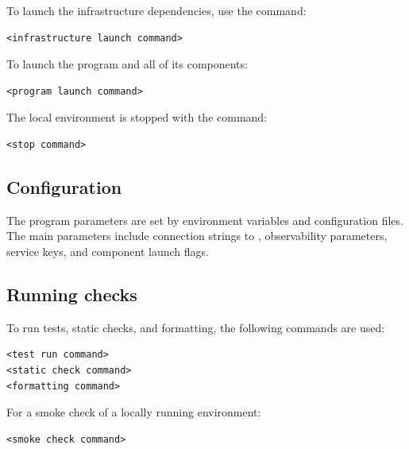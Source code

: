 \documentclass[12pt,a4paper]{extarticle}
\begin{document}
\begin{hseExample}
To launch the infrastructure dependencies, use the command:

\begin{verbatim}
<infrastructure launch command>
\end{verbatim}

To launch the program and all of its components:

\begin{verbatim}
<program launch command>
\end{verbatim}

The local environment is stopped with the command:

\begin{verbatim}
<stop command>
\end{verbatim}
\end{hseExample}

\subsection{Configuration}

\begin{hseExample}
The program parameters are set by environment variables and configuration files. The main parameters include connection strings to , observability parameters, service keys, and component launch flags.
\end{hseExample}

\subsection{Running checks}

\begin{hseExample}
To run tests, static checks, and formatting, the following commands are used:

\begin{verbatim}
<test run command>
<static check command>
<formatting command>
\end{verbatim}

For a smoke check of a locally running environment:

\begin{verbatim}
<smoke check command>
\end{verbatim}
\end{hseExample}
\end{document}
